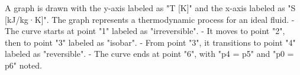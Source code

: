 A graph is drawn with the y-axis labeled as "T [K]" and the x-axis labeled as "S [kJ/kg·K]". The graph represents a thermodynamic process for an ideal fluid.  
- The curve starts at point "1" labeled as "irreversible".  
- It moves to point "2", then to point "3" labeled as "isobar".  
- From point "3", it transitions to point "4" labeled as "reversible".  
- The curve ends at point "6", with "p4 = p5" and "p0 = p6" noted.